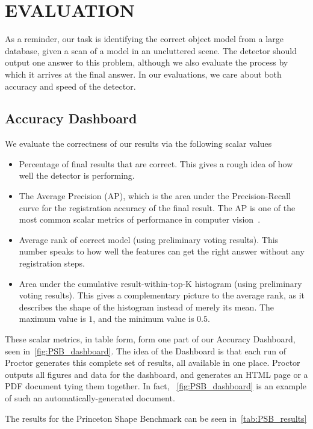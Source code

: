 \section{EVALUATION}

As a reminder, our task is identifying the correct object model from a large database, given a scan of a model in an uncluttered scene.
The detector should output one answer to this problem, although we also evaluate the process by which it arrives at the final answer.
In our evaluations, we care about both accuracy and speed of the detector.

\subsection{Accuracy Dashboard}

We evaluate the correctness of our results via the following scalar values
\begin{itemize}
  \item Percentage of final results that are correct. This gives a rough idea of how well the detector is performing.
  \item The Average Precision (AP), which is the area under the Precision-Recall curve for the registration accuracy of the final result. The AP is one of the most common scalar metrics of performance in computer vision~\cite{pascal-voc-2010}.
  \item Average rank of correct model (using preliminary voting results). This number speaks to how well the features can get the right answer without any registration steps.
  \item Area under the cumulative result-within-top-K histogram (using preliminary voting results). This gives a complementary picture to the average rank, as it describes the shape of the histogram instead of merely its mean. The maximum value is $1$, and the minimum value is $0.5$.
\end{itemize}

These scalar metrics, in table form, form one part of our Accuracy Dashboard, seen in~\autoref{fig:PSB_dashboard}.
The idea of the Dashboard is that each run of Proctor generates this complete set of results, all available in one place.
Proctor outputs all figures and data for the dashboard, and generates an HTML page or a PDF document tying them together.
In fact, ~\autoref{fig:PSB_dashboard} is an example of such an automatically-generated document.

The results for the Princeton Shape Benchmark can be seen in~\autoref{tab:PSB_results}

